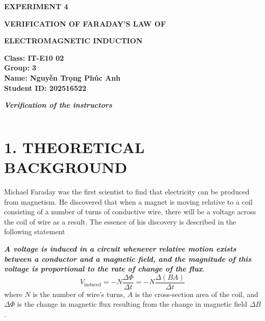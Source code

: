 \documentclass[12pt,oneside,a4paper]{article}
\theoremstyle{definition}
\begin{document}
	\renewcommand{\figurename}{Figure}
	\renewcommand{\tablename}{Table}
	
	\begin{center}
		\textbf{\Large EXPERIMENT 4}
		
		\vspace{0.5cm}
		\textbf{\Large VERIFICATION OF FARADAY'S LAW OF}
		
		\vspace{0.1cm}
		\textbf{{\Large ELECTROMAGNETIC INDUCTION}}
	\end{center}
	
	\vspace{0.5cm}
	
	\noindent
	\begin{minipage}[t]{0.5\textwidth}
		\vspace{0.5cm}
		\textbf{Class: IT-E10 02} \\[0.2cm]
		\textbf{Group: 3} \\[0.2cm]
		\textbf{Name: Nguyễn Trọng Phúc Anh} \\[0.2cm]
		\textbf{Student ID: 202516522}
	\end{minipage}%
	\begin{minipage}[t]{0.5\textwidth}
		\vspace{0pt}
		\centering
		\textit{\textbf{Verification of the instructors}} \\[0.2cm]
		\begin{tabular}{|p{3.5cm}|p{3.5cm}|}
			\hline
			& \\[2.5cm]
			\hline
		\end{tabular}
	\end{minipage}
	
	\vspace{0.8cm}
	\section*{1. THEORETICAL BACKGROUND}
	\qquad Michael Faraday was the first scientist to find that electricity can be produced from magnetism. He discovered that when a magnet is moving relative to a coil consisting of a number of turns of conductive wire, there will be a voltage across the coil of wire as a result. The essence of his discovery is described in the following statement
	
	\textit{\textbf{A voltage is induced in a circuit whenever relative motion exists between a conductor and a magnetic field, and the magnitude of this voltage is proportional to the rate of change of the flux}}.
	\begin{equation}
		V_{\text{induced}} = -N \frac{\Delta \Phi}{\Delta t} = -N \frac{\Delta(BA)}{\Delta t}
	\end{equation}
	where $N$ is the number of wire's turns, $A$ is the cross-section area of the coil, and $\Delta \Phi$ is the change in magnetic flux resulting from the change in magnetic field $\Delta B$.
	
\end{document}

